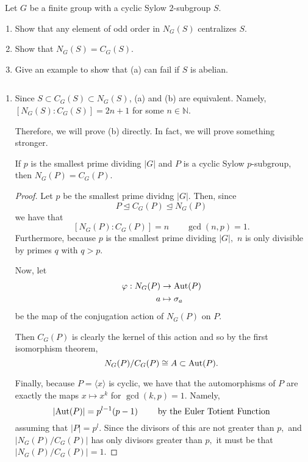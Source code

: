 \documentclass[12pt]{Qual}
\begin{document}
\begin{problem} $\,$
Let $G$ be a finite group with a cyclic Sylow $2$-subgroup $S.$
\begin{enumerate}[label=(\alph*)]
    \item Show that any element of odd order in $N_G(S)$ centralizes $S.$
    \item Show that $N_G(S)=C_G(S).$
    \item Give an example to show that (a) can fail if $S$ is abelian.
\end{enumerate}
\end{problem}


\begin{solution}$\,$
\begin{enumerate}[label=(\alph*)]
    \item Since $S\subset C_G(S)\subset N_G(S)$, (a) and (b) are equivalent. Namely, $[N_G(S):C_G(S)]=2n+1$ for some $n\in\mathbb{N}$.

    Therefore, we will prove (b) directly. In fact, we will prove something stronger.

    \begin{claim} If $p$ is the smallest prime dividing $|G|$ and $P$ is a cyclic Sylow $p$-subgroup, then $N_G(P)=C_G(P).$
    \begin{proof} Let $p$ be the smallest prime dividng $|G|.$ Then, since $$P\trianglelefteq C_G(P)\trianglelefteq N_G(P)$$ we have that $$[N_G(P):C_G(P)]=n\qquad \gcd(n,p)=1.$$ Furthermore, because $p$ is the smallest prime dividing $|G|,$ $n$ is only divisible by primes $q$ with $q>p.$

    Now, let \begin{align*}
        \varphi:N_G(P)&\to\text{Aut}(P)\\
        a&\mapsto\sigma_a
    \end{align*} be the map of the conjugation action of $N_G(P)$ on $P.$

    Then $C_G(P)$ is clearly the kernel of this action and so by the first isomorphism theorem, $$N_G(P)/C_G(P)\cong A\subset\text{Aut}(P).$$

    Finally, because $P=\langle x\rangle$ is cyclic, we have that the automorphisms of $P$ are exactly the maps $x\mapsto x^k$ for $\gcd(k,p)=1$. Namely, $$|\text{Aut}(P)|=p^{l-1}(p-1)\qquad\text{ by the Euler Totient Function}$$ assuming that $|P|=p^l$. Since the divisors of this are not greater than $p,$ and $|N_G(P)/C_G(P)|$ has only divisors greater than $p,$ it must be that $|N_G(P)/C_G(P)|=1.$


\end{proof}
\end{claim}
\end{enumerate}
\end{solution}
\end{document}
